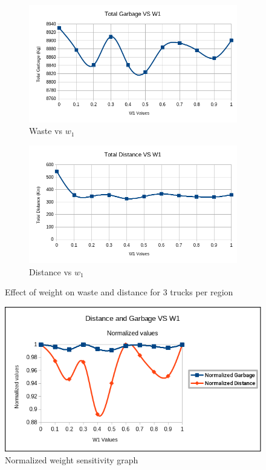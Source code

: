 \documentclass[12pt]{article}
\begin{document}
\begin{figure}[H]
    \centering
    \begin{subfigure}{0.5\textwidth}
        \centering
        \includegraphics[width=\linewidth]{Total_Garbage_VS_W1_3_Trucks.png}
        \caption{Waste vs $w_1$}\label{figs1}
    \end{subfigure}%
    \begin{subfigure}{0.5\textwidth}
        \centering
        \includegraphics[width=\linewidth]{Total_Distance_VS_W1_3_Trucks.png}
        \caption{Distance vs $w_1$}\label{figs2}
    \end{subfigure}
    \caption{Effect of weight on waste and distance for 3 trucks per region}
    \label{figsz}
\end{figure}

\begin{figure}[H]
    \centering
    \includegraphics[scale=0.6]{Distance and Garbage Normalized VS W1.png}
    \caption{Normalized weight sensitivity graph}\label{figs}
\end{figure}
\end{document}
